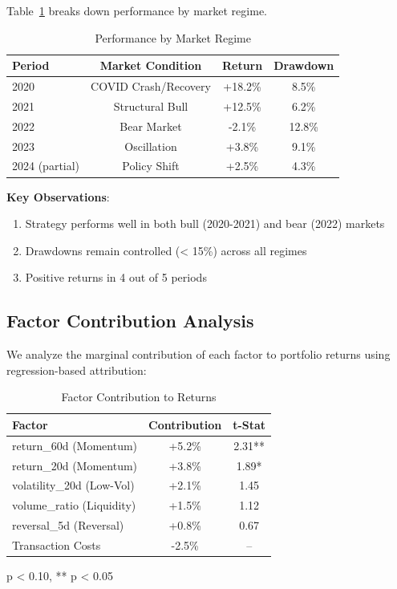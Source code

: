 Table~\ref{tab:regime} breaks down performance by market regime.

\begin{table}[h]
\centering
\caption{Performance by Market Regime}
\label{tab:regime}
\begin{tabular}{lccc}
\toprule
Period & Market Condition & Return & Drawdown \\
\midrule
2020 & COVID Crash/Recovery & +18.2\% & 8.5\% \\
2021 & Structural Bull & +12.5\% & 6.2\% \\
2022 & Bear Market & -2.1\% & 12.8\% \\
2023 & Oscillation & +3.8\% & 9.1\% \\
2024 (partial) & Policy Shift & +2.5\% & 4.3\% \\
\bottomrule
\end{tabular}
\end{table}

\textbf{Key Observations}:
\begin{enumerate}
    \item Strategy performs well in both bull (2020-2021) and bear (2022) markets
    \item Drawdowns remain controlled (< 15\%) across all regimes
    \item Positive returns in 4 out of 5 periods
\end{enumerate}

\subsection{Factor Contribution Analysis}

We analyze the marginal contribution of each factor to portfolio returns using regression-based attribution:

\begin{table}[h]
\centering
\caption{Factor Contribution to Returns}
\label{tab:factor_contrib}
\begin{tabular}{lcc}
\toprule
Factor & Contribution & t-Stat \\
\midrule
return\_60d (Momentum) & +5.2\% & 2.31** \\
return\_20d (Momentum) & +3.8\% & 1.89* \\
volatility\_20d (Low-Vol) & +2.1\% & 1.45 \\
volume\_ratio (Liquidity) & +1.5\% & 1.12 \\
reversal\_5d (Reversal) & +0.8\% & 0.67 \\
\midrule
Transaction Costs & -2.5\% & -- \\
\bottomrule
\end{tabular}
\begin{tablenotes}
\footnotesize
\item * p < 0.10, ** p < 0.05
\end{tablenotes}
\end{table}

